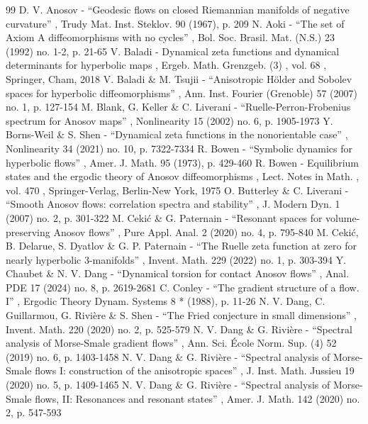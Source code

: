 \documentclass[11pt]{article}
\theoremstyle{definition}
\theoremstyle{plain}
\begin{document}
\begin{thebibliography}{99}
 D. V. Anosov - “Geodesic flows on closed Riemannian manifolds of negative curvature” , Trudy Mat. Inst. Steklov. 90 (1967), p. 209
 N. Aoki - “The set of Axiom A diffeomorphisms with no cycles” , Bol. Soc. Brasil. Mat. (N.S.) 23 (1992) no. 1-2, p. 21-65
 V. Baladi - Dynamical zeta functions and dynamical determinants for hyperbolic maps , Ergeb. Math. Grenzgeb. (3) , vol. 68 , Springer, Cham, 2018
 V. Baladi \& M. Tsujii - “Anisotropic Hölder and Sobolev spaces for hyperbolic diffeomorphisms” , Ann. Inst. Fourier (Grenoble) 57 (2007) no. 1, p. 127-154
 M. Blank, G. Keller \& C. Liverani - “Ruelle-Perron-Frobenius spectrum for Anosov maps” , Nonlinearity 15 (2002) no. 6, p. 1905-1973
 Y. Borns-Weil \& S. Shen - “Dynamical zeta functions in the nonorientable case” , Nonlinearity 34 (2021) no. 10, p. 7322-7334
 R. Bowen - “Symbolic dynamics for hyperbolic flows” , Amer. J. Math. 95 (1973), p. 429-460
 R. Bowen - Equilibrium states and the ergodic theory of Anosov diffeomorphisms , Lect. Notes in Math. , vol. 470 , Springer-Verlag, Berlin-New York, 1975
 O. Butterley \& C. Liverani - “Smooth Anosov flows: correlation spectra and stability” , J. Modern Dyn. 1 (2007) no. 2, p. 301-322
 M. Cekić \& G. Paternain - “Resonant spaces for volume-preserving Anosov flows” , Pure Appl. Anal. 2 (2020) no. 4, p. 795-840
 M. Cekić, B. Delarue, S. Dyatlov \& G. P. Paternain - “The Ruelle zeta function at zero for nearly hyperbolic 3-manifolds” , Invent. Math. 229 (2022) no. 1, p. 303-394
 Y. Chaubet \& N. V. Dang - “Dynamical torsion for contact Anosov flows” , Anal. PDE 17 (2024) no. 8, p. 2619-2681
 C. Conley - “The gradient structure of a flow. I” , Ergodic Theory Dynam. Systems 8 * (1988), p. 11-26
 N. V. Dang, C. Guillarmou, G. Rivière \& S. Shen - “The Fried conjecture in small dimensions” , Invent. Math. 220 (2020) no. 2, p. 525-579
 N. V. Dang \& G. Rivière - “Spectral analysis of Morse-Smale gradient flows” , Ann. Sci. École Norm. Sup. (4) 52 (2019) no. 6, p. 1403-1458
 N. V. Dang \& G. Rivière - “Spectral analysis of Morse-Smale flows I: construction of the anisotropic spaces” , J. Inst. Math. Jussieu 19 (2020) no. 5, p. 1409-1465
 N. V. Dang \& G. Rivière - “Spectral analysis of Morse-Smale flows, II: Resonances and resonant states” , Amer. J. Math. 142 (2020) no. 2, p. 547-593

\end{thebibliography}
\end{document}
